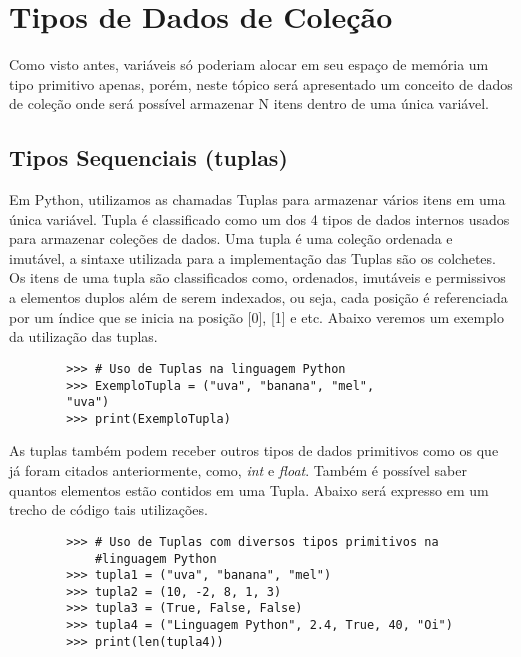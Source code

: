     \section{Tipos de Dados de Cole\c{c}\~{a}o}
Como visto antes, variáveis só poderiam alocar em seu espaço de memória um tipo primitivo apenas, porém, neste tópico será apresentado um conceito de dados de coleção onde será possível armazenar N itens dentro de uma única variável.

            \subsection{Tipos Sequenciais (tuplas)}
     Em Python, utilizamos as chamadas Tuplas para armazenar vários itens em uma única variável. Tupla é classificado como um dos 4 tipos de dados internos usados para armazenar coleções de dados. Uma tupla é uma coleção ordenada e imutável, a sintaxe utilizada para a implementação das Tuplas são os colchetes. \\
     
     Os itens de uma tupla são classificados como, ordenados, imutáveis e permissivos a elementos duplos além de serem indexados, ou seja, cada posição é referenciada por um índice que se inicia na posição [0], [1] e etc. Abaixo veremos um exemplo da utilização das tuplas.
     \begin{lstlisting}
     	>>> # Uso de Tuplas na linguagem Python
     	>>> ExemploTupla = ("uva", "banana", "mel", 
     	"uva")
     	>>> print(ExemploTupla)
     \end{lstlisting}
 
    As tuplas também podem receber outros tipos de dados primitivos como os que já foram citados anteriormente, como, \textit{int} e \textit{float}. Também é possível saber quantos elementos estão contidos em uma Tupla. Abaixo será expresso em um trecho de código tais utilizações.
     
    \begin{lstlisting}
    	>>> # Uso de Tuplas com diversos tipos primitivos na
            #linguagem Python
    	>>> tupla1 = ("uva", "banana", "mel")
    	>>> tupla2 = (10, -2, 8, 1, 3)
    	>>> tupla3 = (True, False, False)
    	>>> tupla4 = ("Linguagem Python", 2.4, True, 40, "Oi")
    	>>> print(len(tupla4))
    	
    \end{lstlisting} 
     
